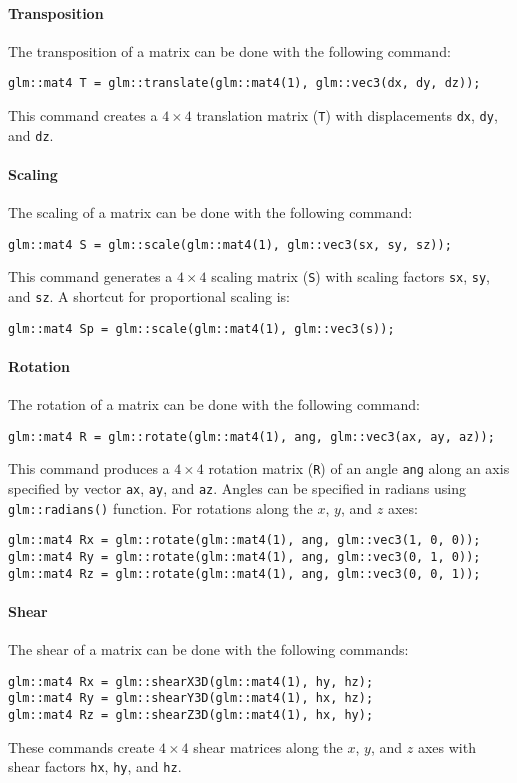 \paragraph*{Transposition}
The transposition of a matrix can be done with the following command: 
\begin{verbatim}
glm::mat4 T = glm::translate(glm::mat4(1), glm::vec3(dx, dy, dz));
\end{verbatim}
This command creates a $4 \times 4$ translation matrix (\texttt{T}) with displacements \texttt{dx}, \texttt{dy}, and \texttt{dz}.

\paragraph*{Scaling}
The scaling of a matrix can be done with the following command:
\begin{verbatim}
glm::mat4 S = glm::scale(glm::mat4(1), glm::vec3(sx, sy, sz)); 
\end{verbatim}
This command generates a $4 \times 4$ scaling matrix (\texttt{S}) with scaling factors \texttt{sx}, \texttt{sy}, and \texttt{sz}. 
A shortcut for proportional scaling is:
\begin{verbatim}
glm::mat4 Sp = glm::scale(glm::mat4(1), glm::vec3(s)); 
\end{verbatim}

\paragraph*{Rotation}
The rotation of a matrix can be done with the following command:
\begin{verbatim}
glm::mat4 R = glm::rotate(glm::mat4(1), ang, glm::vec3(ax, ay, az));
\end{verbatim}
This command produces a $4 \times 4$ rotation matrix (\texttt{R}) of an angle \texttt{ang} along an axis specified by vector \texttt{ax}, \texttt{ay}, and \texttt{az}. 
Angles can be specified in radians using \texttt{glm::radians()} function. 
For rotations along the $x$, $y$, and $z$ axes:
\begin{verbatim}
glm::mat4 Rx = glm::rotate(glm::mat4(1), ang, glm::vec3(1, 0, 0));
glm::mat4 Ry = glm::rotate(glm::mat4(1), ang, glm::vec3(0, 1, 0)); 
glm::mat4 Rz = glm::rotate(glm::mat4(1), ang, glm::vec3(0, 0, 1));
\end{verbatim}

\paragraph*{Shear}
The shear of a matrix can be done with the following commands:
\begin{verbatim}
glm::mat4 Rx = glm::shearX3D(glm::mat4(1), hy, hz);
glm::mat4 Ry = glm::shearY3D(glm::mat4(1), hx, hz); 
glm::mat4 Rz = glm::shearZ3D(glm::mat4(1), hx, hy);
\end{verbatim}
These commands create $4 \times 4$ shear matrices along the $x$, $y$, and $z$ axes with shear factors \texttt{hx}, \texttt{hy}, and \texttt{hz}.